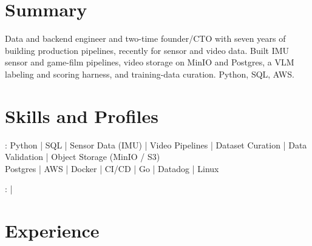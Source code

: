 \documentclass[print]{jack-resume}
\begin{document}
\pagecolor{darkmodeBackground}


\begin{minipage}[t][1cm][t]{.03\textwidth}
    \hfill
\end{minipage}

\section{Summary}
Data and backend engineer and two-time founder/CTO with seven years of building production pipelines, recently for sensor and video data. Built IMU sensor and game-film pipelines, video storage on MinIO and Postgres, a VLM labeling and scoring harness, and training-data curation. Python, SQL, AWS.
\sectionsep

\section{Skills and Profiles}
:
Python \hfill | \hfill
SQL \hfill | \hfill
Sensor Data (IMU) \hfill | \hfill
Video Pipelines \hfill | \hfill
Dataset Curation \hfill | \hfill
Data Validation \hfill | \hfill
Object Storage (MinIO / S3) \\
\hspace{1.0cm} Postgres \hfill | \hfill
AWS \hfill | \hfill
Docker \hfill | \hfill
CI/CD \hfill | \hfill
Go \hfill | \hfill
Datadog \hfill | \hfill
Linux \\

\raggedright{
    :
      \href{https://www.linkedin.com/in/jack-sturtevant/}{ \ExternalLink} |
     \href{https://github.com/jacksturt}{ \ExternalLink}}

\section{Experience}
\end{document}
